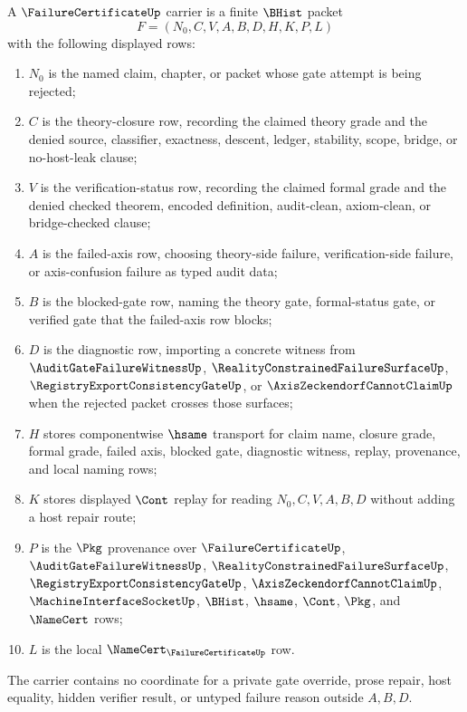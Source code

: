 \begin{definition}
\label{def:failure-certificate-carrier}
A $\FailureCertificateUp$ carrier is a finite $\BHist$ packet
$$
F=(N_0,C,V,A,B,D,H,K,P,L)
$$
with the following displayed rows:
\begin{enumerate}
\item $N_0$ is the named claim, chapter, or packet whose gate attempt is being rejected;
\item $C$ is the theory-closure row, recording the claimed theory grade and the denied source, classifier, exactness, descent, ledger, stability, scope, bridge, or no-host-leak clause;
\item $V$ is the verification-status row, recording the claimed formal grade and the denied checked theorem, encoded definition, audit-clean, axiom-clean, or bridge-checked clause;
\item $A$ is the failed-axis row, choosing theory-side failure, verification-side failure, or axis-confusion failure as typed audit data;
\item $B$ is the blocked-gate row, naming the theory gate, formal-status gate, or verified gate that the failed-axis row blocks;
\item $D$ is the diagnostic row, importing a concrete witness from $\AuditGateFailureWitnessUp$, $\RealityConstrainedFailureSurfaceUp$, $\RegistryExportConsistencyGateUp$, or $\AxisZeckendorfCannotClaimUp$ when the rejected packet crosses those surfaces;
\item $H$ stores componentwise $\hsame$ transport for claim name, closure grade, formal grade, failed axis, blocked gate, diagnostic witness, replay, provenance, and local naming rows;
\item $K$ stores displayed $\Cont$ replay for reading $N_0,C,V,A,B,D$ without adding a host repair route;
\item $P$ is the $\Pkg$ provenance over $\FailureCertificateUp$, $\AuditGateFailureWitnessUp$, $\RealityConstrainedFailureSurfaceUp$, $\RegistryExportConsistencyGateUp$, $\AxisZeckendorfCannotClaimUp$, $\MachineInterfaceSocketUp$, $\BHist$, $\hsame$, $\Cont$, $\Pkg$, and $\NameCert$ rows;
\item $L$ is the local $\NameCert_{\FailureCertificateUp}$ row.
\end{enumerate}
The carrier contains no coordinate for a private gate override, prose repair, host equality, hidden verifier result, or untyped failure reason outside $A,B,D$.
\end{definition}

